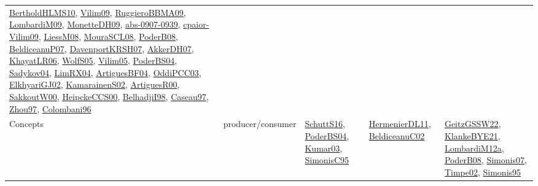 {\begin{longtable}{lp{3cm}>{\raggedright}p{6cm}>{\raggedright}p{6cm}p{8cm}}
\href{papers/BertholdHLMS10.pdf}{BertholdHLMS10}\cite{BertholdHLMS10}, \href{papers/Vilim09.pdf}{Vilim09}\cite{Vilim09}, \href{articles/RuggieroBBMA09.pdf}{RuggieroBBMA09}\cite{RuggieroBBMA09}, \href{papers/LombardiM09.pdf}{LombardiM09}\cite{LombardiM09}, \href{papers/MonetteDH09.pdf}{MonetteDH09}\cite{MonetteDH09}, \href{articles/abs-0907-0939.pdf}{abs-0907-0939}\cite{abs-0907-0939}, \href{papers/cpaior-Vilim09.pdf}{cpaior-Vilim09}\cite{cpaior-Vilim09}, \href{articles/LiessM08.pdf}{LiessM08}\cite{LiessM08}, \href{papers/MouraSCL08.pdf}{MouraSCL08}\cite{MouraSCL08}, \href{papers/PoderB08.pdf}{PoderB08}\cite{PoderB08}, \href{papers/BeldiceanuP07.pdf}{BeldiceanuP07}\cite{BeldiceanuP07}, \href{papers/DavenportKRSH07.pdf}{DavenportKRSH07}\cite{DavenportKRSH07}, \href{papers/AkkerDH07.pdf}{AkkerDH07}\cite{AkkerDH07}, \href{articles/KhayatLR06.pdf}{KhayatLR06}\cite{KhayatLR06}, \href{papers/WolfS05.pdf}{WolfS05}\cite{WolfS05}, \href{papers/Vilim05.pdf}{Vilim05}\cite{Vilim05}, \href{articles/PoderBS04.pdf}{PoderBS04}\cite{PoderBS04}, \href{papers/Sadykov04.pdf}{Sadykov04}\cite{Sadykov04}, \href{papers/LimRX04.pdf}{LimRX04}\cite{LimRX04}, \href{papers/ArtiguesBF04.pdf}{ArtiguesBF04}\cite{ArtiguesBF04}, \href{papers/OddiPCC03.pdf}{OddiPCC03}\cite{OddiPCC03}, \href{papers/ElkhyariGJ02.pdf}{ElkhyariGJ02}\cite{ElkhyariGJ02}, \href{papers/KamarainenS02.pdf}{KamarainenS02}\cite{KamarainenS02}, \href{articles/ArtiguesR00.pdf}{ArtiguesR00}\cite{ArtiguesR00}, \href{articles/SakkoutW00.pdf}{SakkoutW00}\cite{SakkoutW00}, \href{articles/HeipckeCCS00.pdf}{HeipckeCCS00}\cite{HeipckeCCS00}, \href{articles/BelhadjiI98.pdf}{BelhadjiI98}\cite{BelhadjiI98}, \href{papers/Caseau97.pdf}{Caseau97}\cite{Caseau97}, \href{articles/Zhou97.pdf}{Zhou97}\cite{Zhou97}, \href{papers/Colombani96.pdf}{Colombani96}\cite{Colombani96}\\
Concepts & producer/consumer & \href{papers/SchuttS16.pdf}{SchuttS16}\cite{SchuttS16}, \href{articles/PoderBS04.pdf}{PoderBS04}\cite{PoderBS04}, \href{papers/Kumar03.pdf}{Kumar03}\cite{Kumar03}, \href{papers/SimonisC95.pdf}{SimonisC95}\cite{SimonisC95} & \href{papers/HermenierDL11.pdf}{HermenierDL11}\cite{HermenierDL11}, \href{papers/BeldiceanuC02.pdf}{BeldiceanuC02}\cite{BeldiceanuC02} & \href{papers/GeitzGSSW22.pdf}{GeitzGSSW22}\cite{GeitzGSSW22}, \href{papers/KlankeBYE21.pdf}{KlankeBYE21}\cite{KlankeBYE21}, \href{articles/LombardiM12a.pdf}{LombardiM12a}\cite{LombardiM12a}, \href{papers/PoderB08.pdf}{PoderB08}\cite{PoderB08}, \href{articles/Simonis07.pdf}{Simonis07}\cite{Simonis07}, \href{articles/Timpe02.pdf}{Timpe02}\cite{Timpe02}, \href{papers/Simonis95.pdf}{Simonis95}\cite{Simonis95}\\

\end{longtable}}

